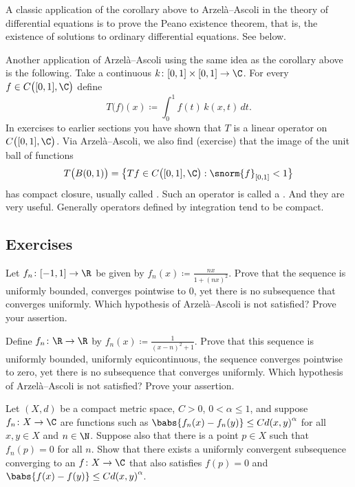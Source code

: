 A classic application of the corollary above to Arzel\`a--Ascoli
in the theory of differential
equations is to prove the Peano existence
theorem, that is, the existence of solutions to ordinary differential
equations.  See  below.

\medskip

Another application of Arzel\`a--Ascoli using the same idea as the
corollary above is the following.
Take a continuous $k \colon [0,1] \times [0,1] \to \C$.
For every $f \in C\bigl([0,1],\C\bigr)$ define
\begin{equation*}
T\bigl(f\bigr)(x) \coloneqq  \int_0^1 f(t) \, k(x,t)\,dt .
\end{equation*}
In exercises to earlier sections you have shown that 
$T$ is a linear operator on $C\bigl([0,1],\C\bigr)$.
Via Arzel\`a--Ascoli, we also find (exercise) that
the image of the unit ball of functions
\begin{equation*}
T\bigl( B(0,1) \bigr) = 
\bigl\{
Tf \in C\bigl([0,1],\C\bigr) :  
\snorm{f}_{[0,1]} < 1
\bigr\}
\end{equation*}
has compact closure, usually called
\emph{}.
Such an operator is called a \emph{}.
And they are very useful.  Generally operators defined by
integration tend to be compact.

\subsection{Exercises}

\begin{exercise}
Let $f_n \colon [-1,1] \to \R$ be given by $f_n(x) \coloneqq \frac{nx}{1+{(nx)}^2}$.
Prove that the sequence is uniformly bounded, converges pointwise to 0,
yet there is no
subsequence that converges uniformly.
Which hypothesis of Arzel\`a--Ascoli
is not satisfied?  Prove your assertion.
\end{exercise}

\begin{exercise}
Define $f_n \colon \R \to \R$ by $f_n(x) \coloneqq \frac{1}{{(x-n)}^2+1}$.  Prove that
this sequence is uniformly bounded, uniformly equicontinuous, the sequence
converges pointwise to zero, yet there is no
subsequence that converges uniformly.
Which hypothesis of Arzel\`a--Ascoli
is not satisfied?  Prove your assertion.
\end{exercise}

\begin{exercise}
Let $(X,d)$ be a compact metric space, $C > 0$, $0 < \alpha \leq 1$, and
suppose $f_n \colon X \to \C$ are functions such as
$\babs{f_n(x)-f_n(y)} \leq C {d(x,y)}^\alpha$ for all $x,y \in X$ and
$n \in \N$.  Suppose also that there is a point $p \in X$ such that
$f_n(p) = 0$ for all $n$.
Show that there exists a uniformly convergent subsequence converging to
an $f \colon X \to \C$ that also satisfies $f(p) = 0$ and
$\babs{f(x)-f(y)} \leq C {d(x,y)}^\alpha$.
\end{exercise}

